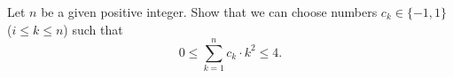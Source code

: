 Let $ n$ be a given positive integer. Show that we can choose numbers $ c_k\in\{-1,1\}$ ($ i\le k\le n$) such that \[ 0\le\sum_{k=1}^nc_k\cdot k^2\le4.\]